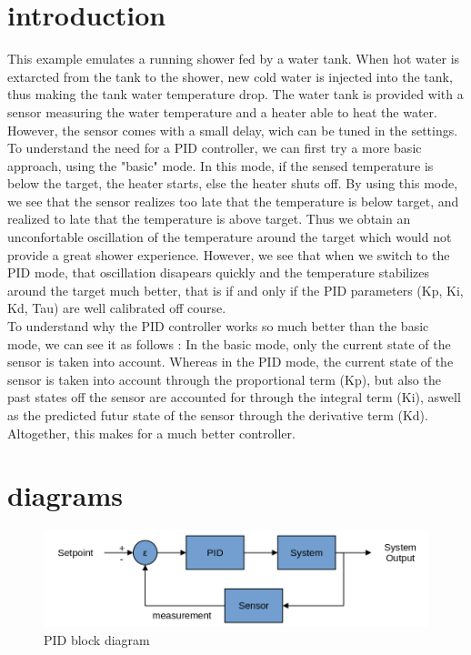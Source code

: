 \documentclass[12pt]{article}
\renewcommand{\=}{\quad = \quad}
\newcommand{\+}{\; + \;}
\begin{document}
	
	\section{introduction}
	
	This example emulates a running shower fed by a water tank.
	When hot water is extarcted from the tank to the shower, new cold water is injected into the tank, thus making the tank water temperature drop.
	The water tank is provided with a sensor measuring the water temperature and a heater able to heat the water.
	However, the sensor comes with a small delay, wich can be tuned in the settings.\\
	
	To understand the need for a PID controller, we can first try a more basic approach, using the "basic" mode.
	In this mode, if the sensed temperature is below the target, the heater starts, else the heater shuts off.
	By using this mode, we see that the sensor realizes too late that the temperature is below target, and realized to late that the temperature is above target.
	Thus we obtain an unconfortable oscillation of the temperature around the target which would not provide a great shower experience.
	However, we see that when we switch to the PID mode, that oscillation disapears quickly and the temperature stabilizes around the target much better,
	that is if and only if the PID parameters (Kp, Ki, Kd, Tau) are well calibrated off course.\\
	
	To understand why the PID controller works so much better than the basic mode, we can see it as follows :
	In the basic mode, only the current state of the sensor is taken into account.
	Whereas in the PID mode, the current state of the sensor is taken into account through the proportional term (Kp),
	but also the past states off the sensor are accounted for through the integral term (Ki),
	aswell as the predicted futur state of the sensor through the derivative term (Kd).
	Altogether, this makes for a much better controller.
	
	\newpage
	
	\section{diagrams}
	


	\begin{figure}[h]
		\centering
		\includegraphics[scale=0.4]{PID.png}
		\caption{PID block diagram}
	\end{figure}
\end{document}
